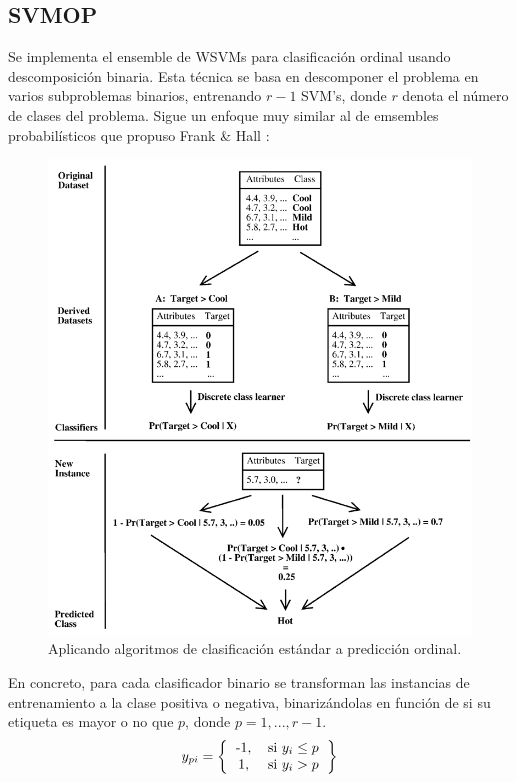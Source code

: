 \subsection{SVMOP}
Se implementa el ensemble de WSVMs para clasificación ordinal \cite{waegeman2009ensemble} usando descomposición binaria.
Esta técnica se basa en descomponer el problema en varios subproblemas binarios, entrenando $r-1$ SVM's, donde $r$ denota el número de clases del problema. 
Sigue un enfoque muy similar al de emsembles probabilísticos que propuso Frank \& Hall \cite{frank2001simple}:

\begin{figure}[H]
	\includegraphics[width=\textwidth]{figures/Frankhall}
	\caption[Short figure name.]{Aplicando algoritmos de clasificación estándar a predicción ordinal.
		\label{fig:myInlineFigure}}
\end{figure}



En concreto, para cada clasificador binario se transforman las instancias de entrenamiento a la clase positiva o negativa, binarizándolas en función de si su etiqueta es mayor o no que $p$, donde $p=1,...,r-1$. \newline
\[ 
y_{pi}=
\left \{
\begin{tabular}{cc}
-1, & si $y_i \leq p$ \\
1, & si $y_i > p$  
\end{tabular}
\right \}
\]

